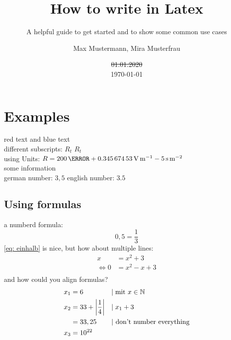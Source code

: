 \documentclass[	%
		fontsize=11pt,  %
		a4paper,	    %
		english,		%
		sans,			%
		f1,				%
	]{HsH-report}		%
\author{
	Max Mustermann,
	Mira Musterfrau
} %
\title{How to write in Latex}
\subtitle{A helpful guide to get started and to show some common use cases}
\date{\st{01.01.2020}\\\today}
\begin{document}

\maketitle[c]
\declarationAuthorship

\begin{abstract}
	\lipsum[5-6]
\end{abstract}

\tableofcontents


\chapter{Examples} \label{chap: one}
	{\color{red}red text} and {\color{blue}blue text} \\
	different subscripts: \normalsubscripts$R_t$ \upsubscripts$R_t$ \\
	using Units: $R=200\,\mohm + \SI{0.34567453}{\volt\per\metre} - 5\,\si{\second\per\metre\squared}$ \\
	some information\cite{laboranleitung:physik}\\
	german number: $3,5$ english number: $3.5$\\ %


	\section{Using formulas} \label{sec: formula}
		a numberd formula:
		\begin{equation}
			\label{eq: einhalb} %
			0,5=\frac{1}{3}
		\end{equation}
		\autoref{eq: einhalb} is nice, but how about multiple lines:
		\begin{equation}
		\begin{split} %
			x &= x^2+3 \\
			\Leftrightarrow 0 &= x^2-x+3 \\
		\end{split}
		\end{equation}
		and how could you align formulas?
		\begin{align}
			x_1 &= 6 &&|\;\mbox{mit } x \in \mathbb{N} \\
			x_2 &= 33+\left\vert\frac{1}{4}\right\vert &&|\;x_1+3 \\
				&= 33,25 &&\mbox{| don't number everything} \notag \\
			x_3 &= 10^{22}
		\end{align}
\end{document}
